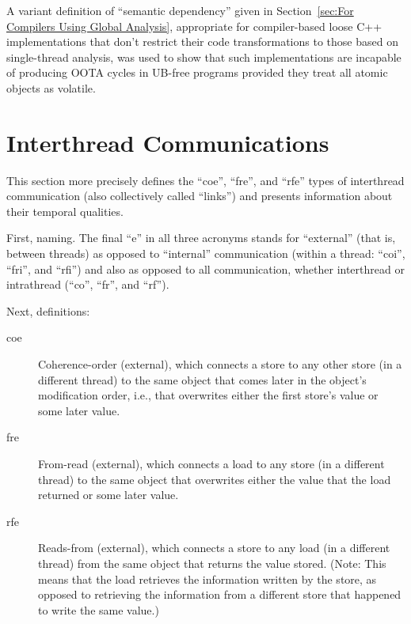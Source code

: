 \documentclass[10]{article}
\begin{document}
A variant definition of ``semantic dependency'' given in
Section~\ref{sec:For Compilers Using Global Analysis}, appropriate for
compiler-based loose C++ implementations that don't restrict
their code transformations to those based on single-thread analysis,
was used to show that such implementations
are incapable of producing OOTA cycles in UB-free programs
provided they treat all atomic objects as volatile.

\clearpage
\appendix

\section{Interthread Communications}
\label{app:Interthread Communications}

This section more precisely defines the ``coe'', ``fre'', and ``rfe''
types of interthread communication (also collectively called ``links'')
and presents information about their temporal qualities.

First, naming.
The final ``e'' in all three acronyms stands for ``external'' (that
is, between threads) as opposed to ``internal'' communication (within
a thread: ``coi'', ``fri'', and ``rfi'') and also as opposed to all
communication, whether interthread or intrathread (``co'', ``fr'', and
``rf'').

Next, definitions:
\begin{description}
\item[coe]
	Coherence-order (external), which connects a store to any other store
	(in a different thread)
	to the same object that comes later in the object's
	modification order, i.e., that overwrites either the first store's
	value or some later value.
\item[fre]
	From-read (external), which connects a load to any store
	(in a different thread) to
	the same object that overwrites either the value that the load
	returned or some later value.
\item[rfe]
	Reads-from (external), which connects a store to any load
	(in a different thread) from
	the same object that returns the value stored.
	(Note: This means that the load retrieves the information
	written by the store, as opposed to retrieving the information
	from a different store that happened to write the same value.)
\end{description}
\end{document}
